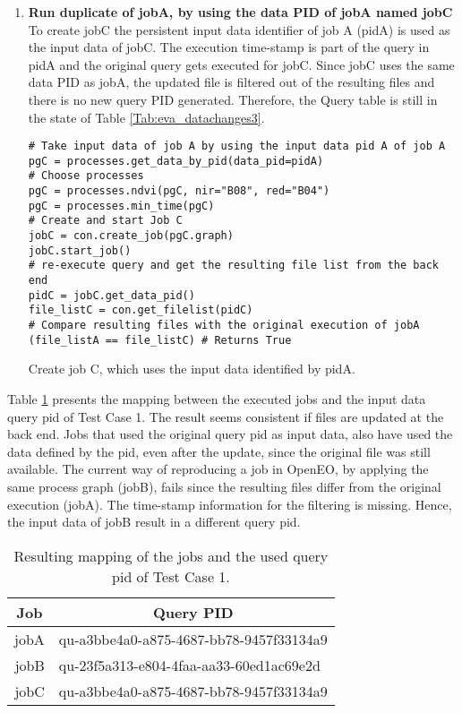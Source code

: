 \documentclass[draft,final]{vutinfth} %
\newenvironment{code}{\captionsetup{type=listing}}{}
\begin{document}
\begin{enumerate}
	\item \textbf{Run duplicate of jobA, by using the data PID of jobA named jobC}\\
To create jobC the persistent input data identifier of job A (pidA) is used as the input data of jobC. The execution time-stamp is part of the query in pidA and the original query gets executed for jobC. Since jobC uses the same data PID as jobA, the updated file is filtered out of the resulting files and there is no new query PID generated. Therefore, the Query table is still in the state of Table \ref{Tab:eva_datachanges3}. 
	\begin{code}
		\begin{verbatim}
# Take input data of job A by using the input data pid A of job A
pgC = processes.get_data_by_pid(data_pid=pidA)
# Choose processes
pgC = processes.ndvi(pgC, nir="B08", red="B04")
pgC = processes.min_time(pgC)
# Create and start Job C
jobC = con.create_job(pgC.graph)
jobC.start_job()
# re-execute query and get the resulting file list from the back end
pidC = jobC.get_data_pid()
file_listC = con.get_filelist(pidC)
# Compare resulting files with the original execution of jobA
(file_listA == file_listC) # Returns True
		\end{verbatim}
		\caption{Create job C, which uses the input data identified by pidA.}
		\label{lst:eva_datachange_5}
	\end{code}
\end{enumerate}

Table \ref{Tab:eva_datachanges4} presents the mapping between the executed jobs and the input data query pid of Test Case 1. The result seems consistent if files are updated at the back end. Jobs that used the original query pid as input data, also have used the data defined by the pid, even after the update, since the original file was still available. The current way of reproducing a job in OpenEO, by applying the same process graph (jobB), fails since the resulting files differ from the original execution (jobA). The time-stamp information for the filtering is missing. Hence,  the input data of jobB result in a different query pid.     

	\begin{table}[]
	\caption{Resulting mapping of the jobs and the used query pid of Test Case 1.}
	\centering
	\begin{tabular}{|r|l|}
		\hline \multicolumn{1}{|c|}{\textbf{Job}}  &  \multicolumn{1}{c|}{\textbf{Query PID}} \\ \hline
		jobA & qu-a3bbe4a0-a875-4687-bb78-9457f33134a9  \\ 
		jobB & qu-23f5a313-e804-4faa-aa33-60ed1ac69e2d \\
		jobC & qu-a3bbe4a0-a875-4687-bb78-9457f33134a9  \\ \hline
	\end{tabular}
	\label{Tab:eva_datachanges4}
\end{table}
\end{document}
